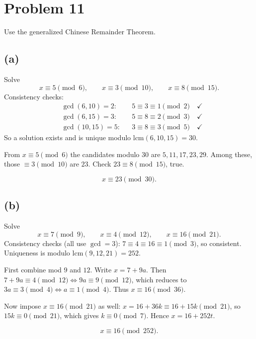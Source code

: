 \section*{Problem 11}

Use the generalized Chinese Remainder Theorem.

\subsection*{(a)}
Solve
\[
x \equiv 5 \pmod{6},\qquad x \equiv 3 \pmod{10},\qquad x \equiv 8 \pmod{15}.
\]
Consistency checks:
\[
\begin{aligned}
&\gcd(6,10)=2: &&5\equiv 3 \equiv 1 \pmod{2}\quad \checkmark\\
&\gcd(6,15)=3: &&5\equiv 8 \equiv 2 \pmod{3}\quad \checkmark\\
&\gcd(10,15)=5:&&3\equiv 8 \equiv 3 \pmod{5}\quad \checkmark
\end{aligned}
\]
So a solution exists and is unique modulo $\mathrm{lcm}(6,10,15)=30$.

From $x\equiv 5 \pmod{6}$ the candidates modulo $30$ are $5,11,17,23,29$.  
Among these, those $\equiv 3 \pmod{10}$ are $23$. Check $23\equiv 8 \pmod{15}$, true.

\[
\boxed{x \equiv 23 \pmod{30}}.
\]

\subsection*{(b)}
Solve
\[
x \equiv 7 \pmod{9},\qquad x \equiv 4 \pmod{12},\qquad x \equiv 16 \pmod{21}.
\]
Consistency checks (all use $\gcd=3$): $7\equiv4\equiv16\equiv 1 \pmod{3}$, so consistent.
Uniqueness is modulo $\mathrm{lcm}(9,12,21)=252$.

First combine mod $9$ and $12$.
Write $x=7+9a$. Then $7+9a\equiv 4 \pmod{12}\iff 9a\equiv 9 \pmod{12}$,
which reduces to $3a\equiv 3 \pmod{4}\iff a\equiv 1 \pmod{4}$.
Thus $x\equiv 16 \pmod{36}$.

Now impose $x\equiv 16 \pmod{21}$ as well:
$x=16+36k \equiv 16+15k \pmod{21}$, so $15k\equiv 0 \pmod{21}$,
which gives $k\equiv 0 \pmod{7}$.
Hence $x=16+252t$.

\[
\boxed{x \equiv 16 \pmod{252}}.
\]
